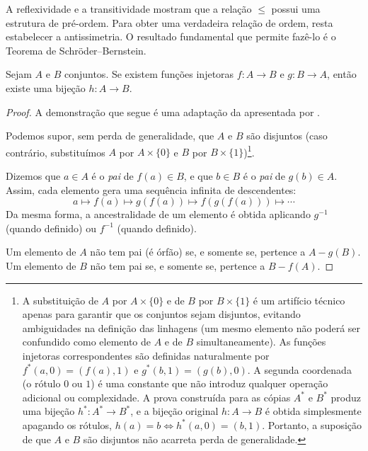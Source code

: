 A reflexividade e a transitividade mostram que a relação \(\leq\) possui uma estrutura de pré-ordem. Para obter uma verdadeira relação de ordem, resta estabelecer a antissimetria. O resultado fundamental que permite fazê-lo é o Teorema de Schröder--Bernstein.

\begin{teorema}
    \label{teo:schroder_bernstein}
    Sejam \(A\) e \(B\) conjuntos. Se existem funções injetoras
    \(f:A\to B\) e \(g:B\to A\), então existe uma bijeção \(h:A\to B\).
\end{teorema}

\begin{proof}
    A demonstração que segue é uma adaptação da apresentada por
    \textcite[p.~89]{halmos2014}.

    Podemos supor, sem perda de generalidade, que \(A\) e \(B\) são disjuntos (caso contrário, substituímos \(A\) por \(A \times \{0\}\) e \(B\) por \(B \times \{1\}\))\footnote{A substituição de \(A\) por \(A \times \{0\}\) e de \(B\) por \(B \times \{1\}\) é um artifício técnico apenas para garantir que os conjuntos sejam disjuntos, evitando ambiguidades na definição das linhagens (um mesmo elemento não poderá ser confundido como elemento de \(A\) e de \(B\) simultaneamente). As funções injetoras correspondentes são definidas naturalmente por \(f^*(a,0) = (f(a),1)\) e \(g^*(b,1) = (g(b),0)\). A segunda coordenada (o rótulo \(0\) ou \(1\)) é uma constante que não introduz qualquer operação adicional ou complexidade. A prova construída para as cópias \(A^*\) e \(B^*\) produz uma bijeção \(h^*: A^* \to B^*\), e a bijeção original \(h: A \to B\) é obtida simplesmente apagando os rótulos, \(h(a) = b \iff h^*(a,0) = (b,1)\). Portanto, a suposição de que \(A\) e \(B\) são disjuntos não acarreta perda de generalidade.}.

    Dizemos que \(a \in A\) é o \textit{pai} de \(f(a) \in B\), e que \(b \in B\) é o \textit{pai} de \(g(b) \in A\). Assim, cada elemento gera uma sequência infinita de descendentes:
    \[
        a \mapsto f(a) \mapsto g(f(a)) \mapsto f(g(f(a))) \mapsto \cdots
    \]
    Da mesma forma, a ancestralidade de um elemento é obtida aplicando \(g^{-1}\) (quando definido) ou \(f^{-1}\) (quando definido).

    Um elemento de \(A\) não tem pai (é órfão) se, e somente se, pertence a \(A - g(B)\).
    Um elemento de \(B\) não tem pai se, e somente se, pertence a \(B - f(A)\).


\end{proof}
